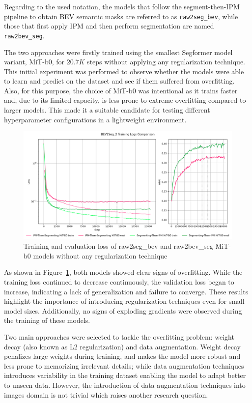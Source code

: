 Regarding to the used notation, the models that follow the segment-then-IPM pipeline to obtain BEV semantic masks are referred to as \texttt{raw2seg\_bev}, while those that first apply IPM and then perform segmentation are named \texttt{raw2bev\_seg}.

The two approaches were firstly trained using the smallest Segformer model variant, MiT-b0, for $20.7K$ steps without applying any regularization technique. This initial experiment was performed to observe whether the models were able to learn and predict on the dataset and see if them suffered from overfitting. Also, for this purpose, the choice of MiT-b0 was intentional as it trains faster and, due to its limited capacity, is less prone to extreme overfitting compared to larger models. This made it a suitable candidate for testing different hyperparameter configurations in a lightweight environment.

\begin{figure}[h!]
    \centering
    \includegraphics[width=0.7\linewidth]{./images/experiments/overfitting_bev_nu.png}
    \caption{Training and evaluation loss of raw2seg\_bev and raw2bev\_seg MiT-b0 models without any regularization technique}
    \label{fig:overfitting_mit-b0}
\end{figure}

As shown in Figure~\ref{fig:overfitting_mit-b0}, both models showed clear signs of overfitting. While the training loss continued to decrease continuously, the validation loss began to increase, indicating a lack of generalization and failure to converge. These results highlight the importance of introducing regularization techniques even for small model sizes. Additionally, no signs of exploding gradients were observed during the training of these models.

Two main approaches were selected to tackle the overfitting problem: weight decay (also known as L2 regularization) and data augmentation. Weight decay penalizes large weights during training, and makes the model more robust and less prone to memorizing irrelevant details; while data augmentation techniques introduces variability in the training dataset enabling the model to adapt better to unseen data. However, the introduction of data augmentation techniques into  images domain is not trivial which raises another research question.

